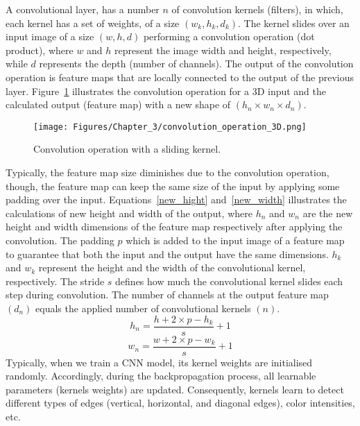 A convolutional layer, has a number \( n\) of convolution kernels (filters), in  which,  each kernel has a set of weights, of a size \((w_k,h_k,d_k)\).
The kernel slides over an input image of a size \((w,h,d)\) performing a convolution operation (dot product), where \(w\) and \(h\) represent the image width and height, respectively, while \(d\) represents the depth (number of channels).
The output of the convolution operation is feature maps that are locally connected to the output of the previous layer. 
Figure~\ref{fig:convolution_3d} illustrates the convolution operation for a 3D input and the calculated output (feature map) with a new shape of \((h_{n}\times w_{n} \times d_{n})\).
\begin{figure} [!ht]
	\begin{center}
		\centering
		\texttt{[image: Figures/Chapter\_3/convolution\_operation\_3D.png]}
	\end{center}
	\caption{Convolution operation with a sliding kernel.} 
	\label{fig:convolution_3d}
\end{figure}

Typically, the feature map size diminishes due to the convolution operation, though, the feature map can keep the same size of the input by applying some padding over the input. 
Equations~\ref{new_hight} and~\ref{new_width} illustrates the calculations of new height and width of the output, where \(h_{n}\) and \(w_{n}\) are the new height and width dimensions of the feature map respectively after applying the convolution. 
The padding \(p\) which is added to the input image of a feature map to guarantee that both the input and the output have the same dimensions.
\(h_{k}\) and \(w_{k}\) represent the height and the width of the convolutional kernel, respectively.
The stride \(s\) defines how much the convolutional kernel slides each step during convolution.
The number of channels at the output feature map \((d_{n})\) equals the applied number of convolutional kernels \((n)\). 
\begin{equation}
	h_{n} = \frac{h+2\times p-h_{k}}{s}+1  
	\label{new_hight}
\end{equation}
\begin{equation}
	w_{n} = \frac{w+2\times p-w_{k}}{s}+1
	\label{new_width}
\end{equation}
Typically,  when we train a CNN model, its kernel weights are initialised randomly.
Accordingly, during the backpropagation process, all learnable parameters (kernels weights) are updated.
Consequently, kernels learn to detect different types of edges (vertical, horizontal, and diagonal edges), color intensities, etc.

